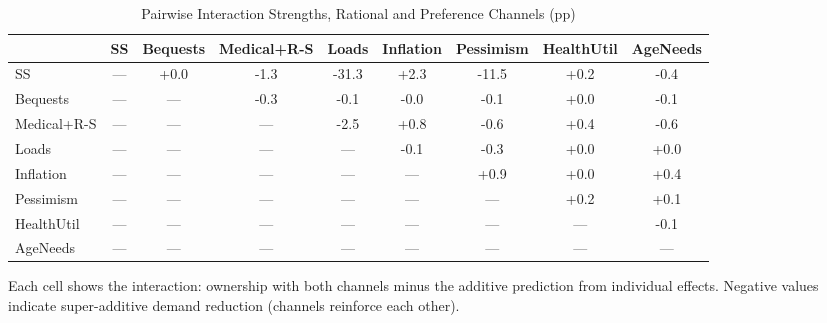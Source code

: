 \begin{table}[htbp]
\centering
\caption{Pairwise Interaction Strengths, Rational and Preference Channels (pp)}
\label{tab:pairwise}
\begin{tabular}{lcccccccc}
\toprule
  & SS & Bequests & Medical+R-S & Loads & Inflation & Pessimism & HealthUtil & AgeNeeds \\
\midrule
SS & --- & +0.0 & -1.3 & -31.3 & +2.3 & -11.5 & +0.2 & -0.4 \\
Bequests & --- & --- & -0.3 & -0.1 & -0.0 & -0.1 & +0.0 & -0.1 \\
Medical+R-S & --- & --- & --- & -2.5 & +0.8 & -0.6 & +0.4 & -0.6 \\
Loads & --- & --- & --- & --- & -0.1 & -0.3 & +0.0 & +0.0 \\
Inflation & --- & --- & --- & --- & --- & +0.9 & +0.0 & +0.4 \\
Pessimism & --- & --- & --- & --- & --- & --- & +0.2 & +0.1 \\
HealthUtil & --- & --- & --- & --- & --- & --- & --- & -0.1 \\
AgeNeeds & --- & --- & --- & --- & --- & --- & --- & --- \\
\bottomrule
\end{tabular}
\begin{tablenotes}
\small
\item Each cell shows the interaction: ownership with both channels minus
the additive prediction from individual effects. Negative values indicate
super-additive demand reduction (channels reinforce each other).
\end{tablenotes}
\end{table}
